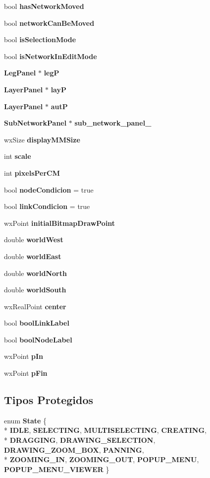 \begin{DoxyCompactItemize}
bool {\bf has\+Network\+Moved}
\item 
bool {\bf network\+Can\+Be\+Moved}
\item 
bool {\bf is\+Selection\+Mode}
\item 
bool {\bf is\+Network\+In\+Edit\+Mode}
\item 
{\bf Leg\+Panel} $\ast$ {\bf legP}
\item 
{\bf Layer\+Panel} $\ast$ {\bf layP}
\item 
{\bf Layer\+Panel} $\ast$ {\bf autP}
\item 
{\bf Sub\+Network\+Panel} $\ast$ {\bf sub\+\_\+network\+\_\+panel\+\_\+}
\item 
wx\+Size {\bf display\+M\+M\+Size}
\item 
int {\bf scale}
\item 
int {\bf pixels\+Per\+CM}
\item 
bool {\bf node\+Condicion} = true
\item 
bool {\bf link\+Condicion} = true
\item 
wx\+Point {\bf initial\+Bitmap\+Draw\+Point}
\item 
double {\bf world\+West}
\item 
double {\bf world\+East}
\item 
double {\bf world\+North}
\item 
double {\bf world\+South}
\item 
wx\+Real\+Point {\bf center}
\item 
bool {\bf bool\+Link\+Label}
\item 
bool {\bf bool\+Node\+Label}
\item 
wx\+Point {\bf p\+In}
\item 
wx\+Point {\bf p\+Fin}
\end{DoxyCompactItemize}
\subsection*{Tipos Protegidos}
\begin{DoxyCompactItemize}
\item 
enum {\bf State} \{ \\*
{\bf I\+D\+LE}, 
{\bf S\+E\+L\+E\+C\+T\+I\+NG}, 
{\bf M\+U\+L\+T\+I\+S\+E\+L\+E\+C\+T\+I\+NG}, 
{\bf C\+R\+E\+A\+T\+I\+NG}, 
\\*
{\bf D\+R\+A\+G\+G\+I\+NG}, 
{\bf D\+R\+A\+W\+I\+N\+G\+\_\+\+S\+E\+L\+E\+C\+T\+I\+ON}, 
{\bf D\+R\+A\+W\+I\+N\+G\+\_\+\+Z\+O\+O\+M\+\_\+\+B\+OX}, 
{\bf P\+A\+N\+N\+I\+NG}, 
\\*
{\bf Z\+O\+O\+M\+I\+N\+G\+\_\+\+IN}, 
{\bf Z\+O\+O\+M\+I\+N\+G\+\_\+\+O\+UT}, 
{\bf P\+O\+P\+U\+P\+\_\+\+M\+E\+NU}, 
{\bf P\+O\+P\+U\+P\+\_\+\+M\+E\+N\+U\+\_\+\+V\+I\+E\+W\+ER}
 \}
\end{DoxyCompactItemize}
